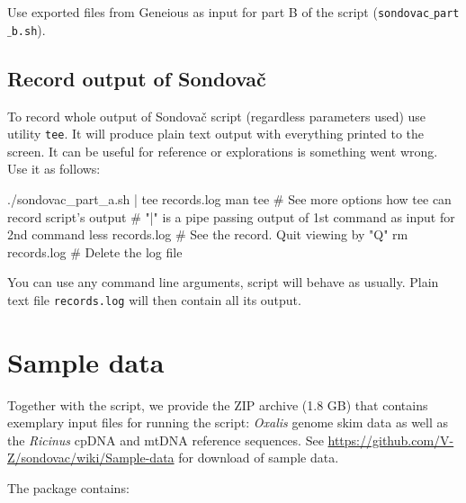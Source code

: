 \documentclass[a4paper, 11pt, twoside]{article}
\begin{document}
Use exported files from Geneious as input for part B of the script (\texttt{sondovac$\_$part$\_$b.sh}).

\subsection{Record output of Sondovač}

To record whole output of Sondovač script (regardless parameters used) use utility \texttt{tee}. It will produce plain text output with everything printed to the screen. It can be useful for reference or explorations is something went wrong. Use it as follows:

\begin{bashcode}
  ./sondovac_part_a.sh | tee records.log
  man tee # See more options how tee can record script's output
  # "|" is a pipe passing output of 1st command as input for 2nd command
  less records.log # See the record. Quit viewing by "Q"
  rm records.log # Delete the log file
\end{bashcode}

You can use any command line arguments, script will behave as usually. Plain text file \texttt{records.log} will then contain all its output.

\section{Sample data}

Together with the script, we provide the ZIP archive (1.8 GB) that contains exemplary input files for running the script: \textit{Oxalis} genome skim data as well as the \textit{Ricinus} cpDNA and mtDNA reference sequences. See \href{https://github.com/V-Z/sondovac/wiki/Sample-data}{https://github.com/V-Z/sondovac/wiki/Sample-data} for download of sample data.

The package contains:
\end{document}
